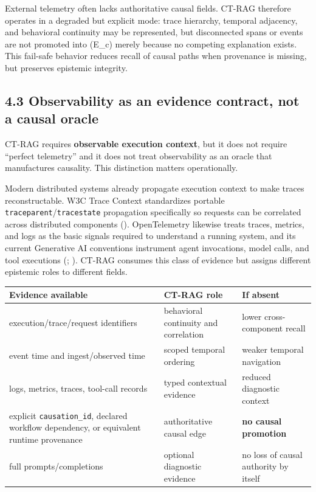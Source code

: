\documentclass[
  11pt,
]{article}
\begin{document}
External telemetry often lacks authoritative causal fields. CT-RAG
therefore operates in a degraded but explicit mode: trace hierarchy,
temporal adjacency, and behavioral continuity may be represented, but
disconnected spans or events are not promoted into (E\_c) merely because
no competing explanation exists. This fail-safe behavior reduces recall
of causal paths when provenance is missing, but preserves epistemic
integrity.

\subsection{4.3 Observability as an evidence contract, not a causal
oracle}\label{observability-evidence-contract}

CT-RAG requires \textbf{observable execution context}, but it does not
require “perfect telemetry” and it does not treat observability as an
oracle that manufactures causality. This distinction matters
operationally.

Modern distributed systems already propagate execution context to make
traces reconstructable. W3C Trace Context standardizes portable
\texttt{traceparent}/\texttt{tracestate} propagation specifically so
requests can be correlated across distributed components
().
OpenTelemetry likewise treats traces, metrics, and logs as the basic
signals required to understand a running system, and its current
Generative AI conventions instrument agent invocations, model calls, and
tool executions
(;
). CT-RAG consumes this
class of evidence but assigns different epistemic roles to different
fields.

\begin{longtable}[]{@{}lll@{}}
\toprule\noalign{}
Evidence available & CT-RAG role & If absent \\
\midrule\noalign{}
\endhead
\bottomrule\noalign{}
\endlastfoot
execution/trace/request identifiers & behavioral continuity and correlation & lower cross-component recall \\
event time and ingest/observed time & scoped temporal ordering & weaker temporal navigation \\
logs, metrics, traces, tool-call records & typed contextual evidence & reduced diagnostic context \\
explicit \texttt{causation\_id}, declared workflow dependency, or equivalent runtime provenance & authoritative causal edge & \textbf{no causal promotion} \\
full prompts/completions & optional diagnostic evidence & no loss of causal authority by itself \\
\end{longtable}
\end{document}
